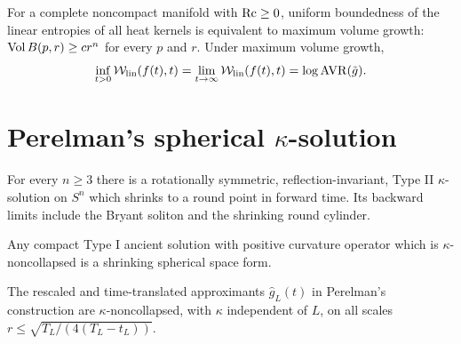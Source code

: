 \begin{theorem}
\label{thm:chow-iii-linear-entropy-volume}

For a complete noncompact manifold with $\operatorname{Rc}\ge0$, uniform boundedness of the
linear entropies of all heat kernels is equivalent to maximum volume growth:
$\operatorname{Vol} B(p,r)\ge cr^n$ for every $p$ and $r$.  Under maximum volume growth,
\[
\inf_{t>0}\mathcal W_{\rm lin}(f(t),t)=\lim_{t\to\infty}\mathcal W_{\rm lin}(f(t),t)
=\log\operatorname{AVR}(\tilde g).
\]
\end{theorem}

\section{\texorpdfstring{Perelman's spherical $\kappa$-solution}{Perelman's spherical Kappa-solution}}

\begin{theorem}
\label{thm:chow-iii-perelman-sphere}


For every $n\ge3$ there is a rotationally symmetric, reflection-invariant,
Type II $\kappa$-solution on $S^n$ which shrinks to a round point in forward
time.  Its backward limits include the Bryant soliton and the shrinking round
cylinder.
\end{theorem}

\begin{theorem}
\label{thm:chow-iii-compact-type-i}

Any compact Type I ancient solution with positive curvature operator which is
$\kappa$-noncollapsed is a shrinking spherical space form.
\end{theorem}

\begin{lemma}
\label{lem:chow-iii-normalized-family-noncollapsed}

The rescaled and time-translated approximants $\hat g_L(t)$ in Perelman's
construction are $\kappa$-noncollapsed, with $\kappa$ independent of $L$, on
all scales $r\le\sqrt{T_L/(4(T_L-t_L))}$.
\end{lemma}

